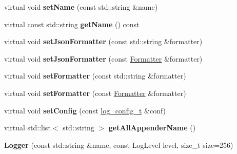 \begin{DoxyCompactItemize}
virtual void {\bfseries set\+Name} (const std\+::string \&name)
\item 
\mbox{\label{classLogger_ab42940e01ac35b793d7580084e6f3670}} 
virtual const std\+::string {\bfseries get\+Name} () const
\item 
\mbox{\label{classLogger_aace56b5c299a0fb60ea1e3a4bed2c58c}} 
virtual void {\bfseries set\+Json\+Formatter} (const std\+::string \&formatter)
\item 
\mbox{\label{classLogger_a06df4cd0731e7bcc4337fcbd2222379b}} 
virtual void {\bfseries set\+Json\+Formatter} (const \hyperlink{classFormatter}{Formatter} \&formatter)
\item 
\mbox{\label{classLogger_ae4682e262a93abab326f3ebbe613eebf}} 
virtual void {\bfseries set\+Formatter} (const std\+::string \&formatter)
\item 
\mbox{\label{classLogger_a0724992a73475a8712547a1f7a638ad3}} 
virtual void {\bfseries set\+Formatter} (const \hyperlink{classFormatter}{Formatter} \&formatter)
\item 
\mbox{\label{classLogger_a844897f52a85855c751a9d908966ffdd}} 
virtual void {\bfseries set\+Config} (const \hyperlink{structLogConfigStruct}{log\+\_\+config\+\_\+t} \&conf)
\item 
\mbox{\label{classLogger_ac43b76e30145c4f9a8310a89e88e0255}} 
virtual std\+::list$<$ std\+::string $>$ {\bfseries get\+All\+Appender\+Name} ()
\item 
\mbox{\label{classLogger_af4d0bc83c311dfb4bedf653ebaaeff24}} 
{\bfseries Logger} (const std\+::string \&name, const Log\+Level level, size\+\_\+t size=256)
\end{DoxyCompactItemize}
